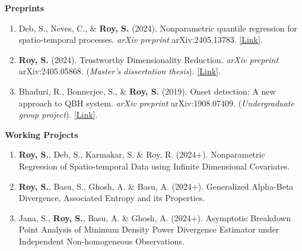 \documentclass[10pt]{developercv} %
\begin{document}
\textbf{Preprints}
\begin{enumerate}
    \item Deb, S., Neves, C., \& \textbf{Roy, S.} (2024). Nonparametric quantile regression for spatio-temporal processes. \emph{arXiv preprint} arXiv:2405.13783. \href{https://arxiv.org/abs/2405.13783}{[Link]}.
    \item \textbf{Roy, S.} (2024). Trustworthy Dimensionality Reduction. \emph{arXiv preprint} arXiv:2405.05868. (\textit{Master's dissertation thesis}). \href{https://arxiv.org/abs/2405.05868}{[Link]}.
    \item Bhaduri, R., Bonnerjee, S., \& \textbf{Roy, S.} (2019). Onset detection: A new approach to QBH system. \emph{arXiv preprint} arXiv:1908.07409. (\textit{Undergraduate group project}). \href{https://arxiv.org/abs/1908.07409}{[Link]}.
\end{enumerate}

\vspace{0.1cm}
\textbf{Working Projects}
\begin{enumerate}
    \item \textbf{Roy, S.}, Deb, S., Karmakar, S. \& Roy, R. (2024+). Nonparametric Regression of Spatio-temporal Data using Infinite Dimensional Covariates.
    \item \textbf{Roy, S.}, Basu, S., Ghosh, A. \& Basu, A. (2024+). Generalized Alpha-Beta Divergence, Associated Entropy and its Properties.
    \item Jana, S., \textbf{Roy, S.}, Basu, A. \& Ghosh, A. (2024+). Asymptotic Breakdown Point Analysis of Minimum Density Power Divergence Estimator under Independent Non-homogeneous Observations.
\end{enumerate}


\vspace*{-10pt}
\end{document}
